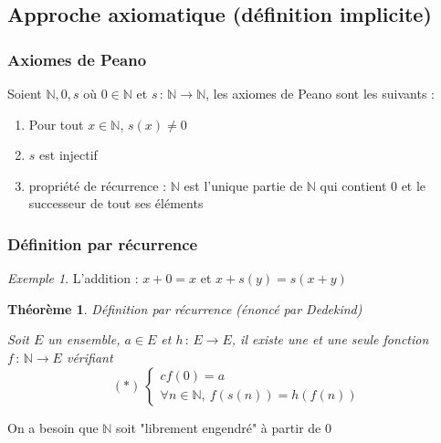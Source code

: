 \documentclass[]{article}
\newtheorem{mythm}{Théorème}
\theoremstyle{remark}
\newtheorem{myexmpl}{Exemple}
\theoremstyle{definition}
\newcommand{\funcshort}[3]{
	#1 \, : \, #2 \longrightarrow #3
}
\begin{document}
\subsection{Approche axiomatique (définition implicite)}

\subsubsection{Axiomes de Peano}

Soient $\mathbb{N}, 0, s$ où $0 \in \mathbb{N}$ et $\funcshort{s}{\mathbb{N}}{\mathbb{N}}$, les axiomes de Peano sont les suivants :
\begin{enumerate}
	\item Pour tout $x \in \mathbb{N}$, $s (x) \neq 0$
	\item $s$ est injectif
	\item propriété de récurrence : $\mathbb{N}$ est l'unique partie de $\mathbb{N}$ qui contient 0 et le successeur de tout ses éléments
\end{enumerate}

\subsubsection{Définition par récurrence}

\begin{myexmpl}
	L'addition : $x + 0 = x$ et $x + s(y) = s (x + y)$
\end{myexmpl}

\begin{mythm} Définition par récurrence (énoncé par Dedekind)
	
	Soit $E$ un ensemble, $a \in E$ et $\funcshort{h}{E}{E}$, il existe une et une seule fonction $\funcshort{f}{\mathbb{N}}{E}$ vérifiant
	$$
	(*) ~\left\{
	\begin{matrix}{c}
		f(0) = a \\
		\forall n \in \mathbb{N}, ~ f(s(n)) = h(f(n))
	\end{matrix}
	\right.
	$$
\end{mythm}

On a besoin que $\mathbb{N}$ soit "librement engendré" à partir de 0
\end{document}

